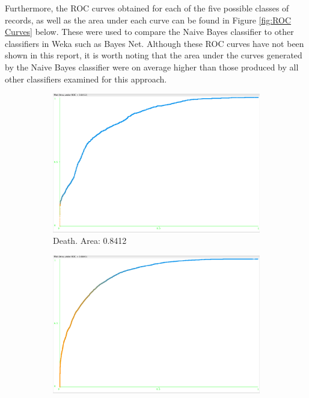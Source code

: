 \documentclass[11pt, notitlepage,abstracton,oneside]{article}   	%
\begin{document}
Furthermore, the ROC curves obtained for each of the five possible classes of records, as well as the area under each curve can be found in Figure \ref{fig:ROC Curves} below. These were used to compare the Naive Bayes classifier to other classifiers in Weka such as Bayes Net. Although these ROC curves have not been shown in this report, it is worth noting that the area under the curves generated by the Naive Bayes classifier were on average higher than those produced by all other classifiers examined for this approach.

\begin{figure}[H]
    \centering
    \begin{subfigure}[b]{0.3\textwidth}
        \centering
        \includegraphics[width=\textwidth]{figures/death}
        \caption{Death. Area: 0.8412}
        \label{fig:death}
    \end{subfigure}
    \hfill
    \begin{subfigure}[b]{0.3\textwidth}
        \centering
        \includegraphics[width=\textwidth]{figures/injury}

\end{subfigure}
\end{figure}
\end{document}
